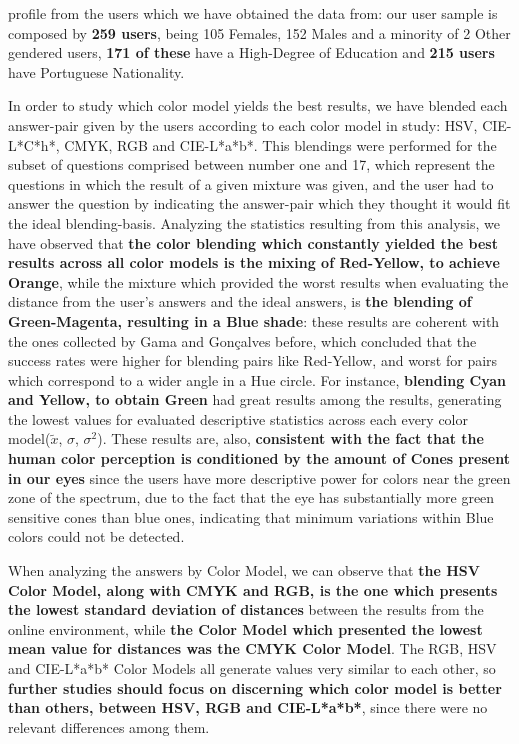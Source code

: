profile from the users which we have obtained the data from: our user sample is composed by \textbf{259 users}, being 105 Females, 152 Males and a minority of 2 Other gendered users, \textbf{171 of these} have a High-Degree of Education and \textbf{215 users} have
Portuguese Nationality. \par
%
In order to study which color model yields the best results, we have blended each answer-pair given by the users according to each color model in study: HSV, CIE-L*C*h*, CMYK, RGB and CIE-L*a*b*. This blendings were performed for the subset of questions comprised between
number one and 17, which represent the questions in which the result of a given mixture was given, and the user had to answer the question by indicating the answer-pair which they thought it would fit the ideal blending-basis. Analyzing the statistics resulting from this
analysis, we have observed that \textbf{the color blending which constantly yielded the best results across all color models is the mixing of Red-Yellow, to achieve Orange}, while the mixture which provided the worst results when evaluating the distance from the user's
answers and the ideal answers, is \textbf{the blending of Green-Magenta, resulting in a Blue shade}: these results are coherent with the ones collected by Gama and Gonçalves \cite{Gama20141} before, which concluded that the success rates were higher for blending pairs
like Red-Yellow, and worst for pairs which correspond to a wider angle in a Hue circle. For instance, \textbf{blending Cyan and Yellow, to obtain Green} had great results among the results, generating the lowest values for evaluated descriptive statistics across each
every color model($\tilde{x}$, $\sigma$, $\sigma^2$). These results are, also, \textbf{consistent with the fact that the human color perception is conditioned by the amount of Cones present in our eyes} since the users have more descriptive power for colors near the
green zone of the spectrum, due to the fact that the eye has substantially more green sensitive cones than blue ones, indicating that minimum variations within Blue colors could not be detected. \par
%
When analyzing the answers by Color Model, we can observe that \textbf{the HSV Color Model, along with CMYK and RGB, is the one which presents the lowest standard deviation of distances} between the results from the online environment, while \textbf{the Color Model
which presented the lowest mean value for distances was the CMYK Color Model}. The RGB, HSV and CIE-L*a*b* Color Models all generate values very similar to each other, so \textbf{further studies should focus on discerning which color model is better than others, between
HSV, RGB and CIE-L*a*b*}, since there were no relevant differences among them. \par

